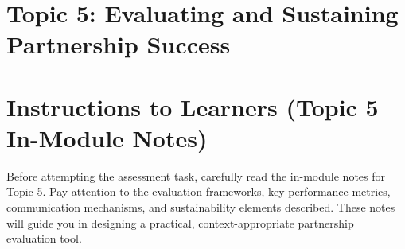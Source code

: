 \documentclass[10pt]{article}
\begin{document}
\section*{Topic 5: Evaluating and Sustaining Partnership Success}
\section*{Instructions to Learners (Topic 5 In-Module Notes)}
Before attempting the assessment task, carefully read the in-module notes for Topic 5. Pay attention to the evaluation frameworks, key performance metrics, communication mechanisms, and sustainability elements described. These notes will guide you in designing a practical, context-appropriate partnership evaluation tool.
\end{document}
